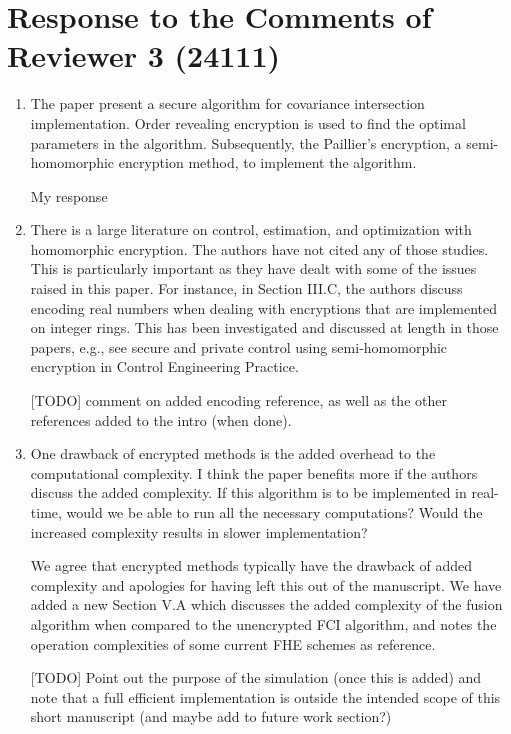 \documentclass[a4paper]{scrartcl}
\newenvironment{rebuttal}{\begin{enumerate}[label={\color{grey}\thesection.\arabic{enumi}},leftmargin=0pt,ref=\thesection.\arabic{enumi}]}{\end{enumerate}}
\newcommand{\reviewtext}[1]{{\color{nblue} #1}}
\begin{document}
\section*{Response to the Comments of Reviewer 3 (24111)}
\def\thesection{R3}
\begin{rebuttal}
\item \reviewtext{The paper present a secure algorithm for covariance intersection
implementation. Order revealing encryption is used to find the optimal
parameters in the algorithm. Subsequently, the Paillier's encryption, a
semi-homomorphic encryption method, to implement the algorithm. }

My response

\item \reviewtext{There is a large literature on control, estimation, and optimization
with homomorphic encryption. The authors have not cited any of those
studies. This is particularly important as they have dealt with some of
the issues raised in this paper. For instance, in Section III.C, the
authors discuss encoding real numbers when dealing with encryptions
that are implemented on integer rings. This has been investigated and
discussed at length in those papers, e.g., see secure and private
control using semi-homomorphic encryption in Control Engineering
Practice.}

[TODO] comment on added encoding reference, as well as the other references added to the intro (when done).

\item \reviewtext{One drawback of encrypted methods is the added overhead to the
computational complexity. I think the paper benefits more if the
authors discuss the added complexity. If this algorithm is to be
implemented in real-time, would we be able to run all the necessary
computations? Would the increased complexity results in slower
implementation?}

We agree that encrypted methods typically have the drawback of added complexity and apologies for having left this out of the manuscript. We have added a new Section V.A which discusses the added complexity of the fusion algorithm when compared to the unencrypted FCI algorithm, and notes the operation complexities of some current FHE schemes as reference. 

[TODO] Point out the purpose of the simulation (once this is added) and note that a full efficient implementation is outside the intended scope of this short manuscript (and maybe add to future work section?)


\end{rebuttal}


\end{document}
